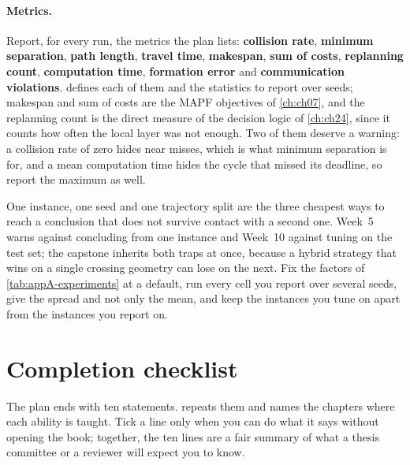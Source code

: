 \paragraph{Metrics.}
Report, for every run, the metrics the plan lists: \textbf{collision rate}, \textbf{minimum
separation}, \textbf{path length}, \textbf{travel time}, \textbf{makespan}, \textbf{sum of
costs}, \textbf{replanning count}, \textbf{computation time}, \textbf{formation error} and
\textbf{communication violations}.  defines each of
them and the statistics to report over seeds; makespan and sum of costs are the MAPF
objectives of \cref{ch:ch07}, and the replanning count is the direct measure of the decision
logic of \cref{ch:ch24}, since it counts how often the local layer was not enough. Two of
them deserve a warning: a collision rate of zero hides near misses, which is what minimum
separation is for, and a mean computation time hides the cycle that missed its deadline, so
report the maximum as well.

\begin{pitfall}
One instance, one seed and one trajectory split are the three cheapest ways to reach a
conclusion that does not survive contact with a second one. Week~5 warns against concluding
from one instance and Week~10 against tuning on the test set; the capstone inherits both
traps at once, because a hybrid strategy that wins on a single crossing geometry can lose on
the next. Fix the factors of \cref{tab:appA-experiments} at a default, run every cell you
report over several seeds, give the spread and not only the mean, and keep the instances you
tune on apart from the instances you report on.
\end{pitfall}
\FloatBarrier

\section{Completion checklist}
\label{sec:appA-checklist}

The plan ends with ten statements.  repeats them and names the
chapters where each ability is taught. Tick a line only when you can do what it says without
opening the book; together, the ten lines are a fair summary of what a thesis committee or
a reviewer will expect you to know.


